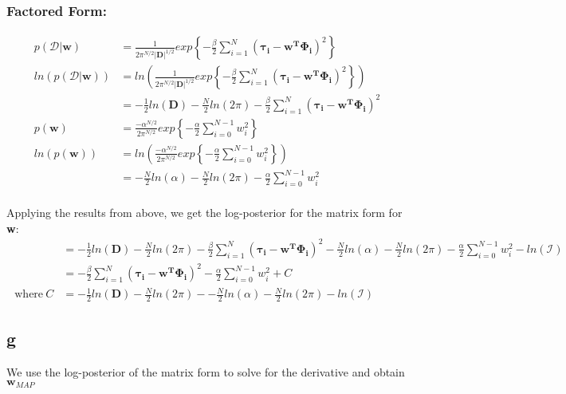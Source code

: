 \documentclass[a4paper]{article}
\begin{document}
\subsubsection*{Factored Form:} 
\begin{align*}
   p(\mathcal{D}|\pmb{w}) &= \frac{1}{2\pi^{N/2}|\pmb{D}|^{1/2}}exp\left\{-\frac{\beta}{2}\sum_{i=1}^{N}(\pmb{\tau_i}-\pmb{w^{T} \Phi_i})^{2} \right\} \\
   ln(p(\mathcal{D}|\pmb{w})) &= ln\left(\frac{1}{2\pi^{N/2}|\pmb{D}|^{1/2}}exp\left\{-\frac{\beta}{2}\sum_{i=1}^{N}(\pmb{\tau_i}-\pmb{w^{T} \Phi_i})^{2} \right\} \right) \\
   &= -\frac{1}{2}ln(\pmb{D}) - \frac{N}{2}ln(2\pi) - \frac{\beta}{2}\sum_{i=1}^{N}(\pmb{\tau_i}-\pmb{w^{T} \Phi_i})^{2} \\
   p(\pmb{w}) &= \frac{-\alpha^{N/2}}{2\pi^{N/2}}exp\left\{-\frac{\alpha}{2}\sum_{i=0}^{N-1}w_i^{2} \right\} \\
   ln(p(\pmb{w})) &= ln\left(\frac{-\alpha^{N/2}}{2\pi^{N/2}}exp\left\{-\frac{\alpha}{2}\sum_{i=0}^{N-1}w_i^{2} \right\} \right)\\
   &= -\frac{N}{2}ln(\alpha) - \frac{N}{2}ln(2\pi) -\frac{\alpha}{2}\sum_{i=0}^{N-1}w_i^{2} \\
\end{align*}{}

Applying the results from above, we get the log-posterior for the matrix form for \textbf{w}:
\begin{align*}
    &=-\frac{1}{2}ln(\pmb{D}) - \frac{N}{2}ln(2\pi) - \frac{\beta}{2}\sum_{i=1}^{N}(\pmb{\tau_i}-\pmb{w^{T} \Phi_i})^{2} -\frac{N}{2}ln(\alpha) - \frac{N}{2}ln(2\pi) -\frac{\alpha}{2}\sum_{i=0}^{N-1}w_i^{2} - ln(\mathcal{I}) \\
    &= -\frac{\beta}{2}\sum_{i=1}^{N}(\pmb{\tau_i}-\pmb{w^{T} \Phi_i})^{2} -\frac{\alpha}{2}\sum_{i=0}^{N-1}w_i^{2} + C \\
    \text{\ where}\ C &= -\frac{1}{2}ln(\pmb{D}) - \frac{N}{2}ln(2\pi) - -\frac{N}{2}ln(\alpha) - \frac{N}{2}ln(2\pi) - ln(\mathcal{I})
\end{align*}{}


\subsection*{g}
We use the log-posterior of the matrix form to solve for the derivative and obtain $\textbf{w}_{MAP}$
\end{document}
